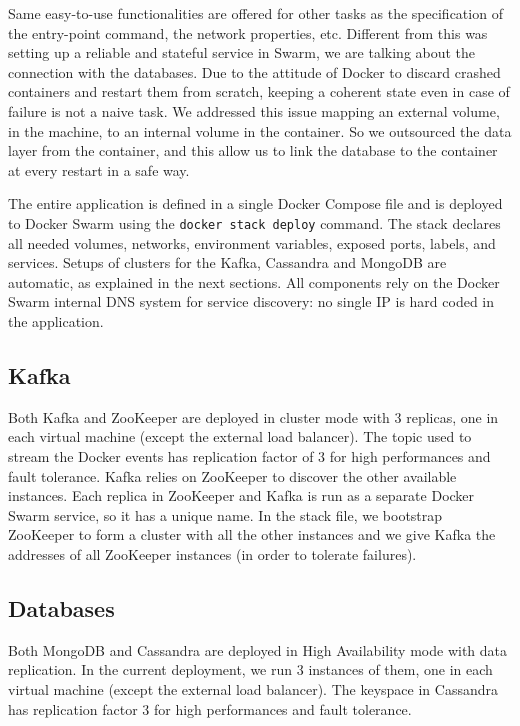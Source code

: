 Same easy-to-use functionalities are offered for other tasks as the specification of the entry-point command, the network properties, etc.
Different from this was setting up a reliable and stateful service in Swarm, we are talking about the connection with the databases. Due to the attitude of Docker to discard crashed containers and restart them from scratch, keeping a coherent state even in case of failure is not a naive task.
We addressed this issue mapping an external volume, in the machine, to an internal volume in the container.
So we outsourced the data layer from the container, and this allow us to link the database to the container at every restart in a safe way.

The entire application is defined in a single Docker Compose file and is deployed to Docker Swarm using the \texttt{docker stack deploy} command.
The stack declares all needed volumes, networks, environment variables, exposed ports, labels, and services.
Setups of clusters for the Kafka, Cassandra and MongoDB are automatic, as explained in the next sections.
All components rely on the Docker Swarm internal DNS system for service discovery: no single IP is hard coded in the application.


\subsection{Kafka}
Both Kafka and ZooKeeper are deployed in cluster mode with $3$ replicas, one in each virtual machine (except the external load balancer).
The topic used to stream the Docker events has replication factor of $3$ for high performances and fault tolerance.
Kafka relies on ZooKeeper to discover the other available instances.
Each replica in ZooKeeper and Kafka is run as a separate Docker Swarm service, so it has a unique name.
In the stack file, we bootstrap ZooKeeper to form a cluster with all the other instances and we give Kafka the addresses of all ZooKeeper instances (in order to tolerate failures).

\subsection{Databases}
Both MongoDB and Cassandra are deployed in High Availability mode with data replication.
In the current deployment, we run $3$ instances of them, one in each virtual machine (except the external load balancer).
The keyspace in Cassandra has replication factor $3$ for high performances and fault tolerance.

